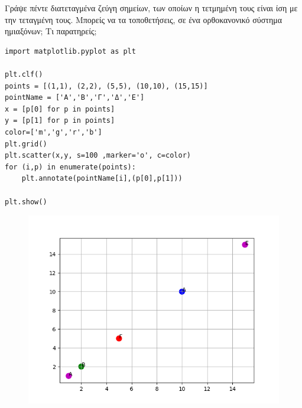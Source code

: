 \begin{exercise}
Γράψε πέντε διατεταγμένα ζεύγη σημείων, των οποίων η τετμημένη τους είναι ίση με
την τεταγμένη τους. Μπορείς να τα
τοποθετήσεις, σε ένα ορθοκανονικό
σύστημα ημιαξόνων; Τι παρατηρείς;
\end{exercise}
\begin{lstlisting}
import matplotlib.pyplot as plt

plt.clf()
points = [(1,1), (2,2), (5,5), (10,10), (15,15)]
pointName = ['Α','Β','Γ','Δ','Ε']
x = [p[0] for p in points]
y = [p[1] for p in points]
color=['m','g','r','b']
plt.grid()
plt.scatter(x,y, s=100 ,marker='o', c=color)
for (i,p) in enumerate(points):
    plt.annotate(pointName[i],(p[0],p[1]))

plt.show()
\end{lstlisting}
\begin{figure}
\includegraphics{graph3.png}
\end{figure}
